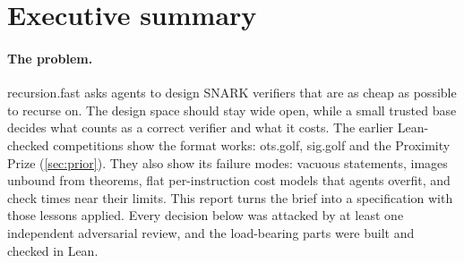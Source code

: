 \section{Executive summary}\label{sec:summary}

\paragraph{The problem.} recursion.fast asks agents to design SNARK verifiers that are as cheap as
possible to recurse on. The design space should stay wide open, while a small trusted base decides
what counts as a correct verifier and what it costs. The earlier Lean-checked competitions show the
format works: ots.golf, sig.golf and the Proximity Prize (\cref{sec:prior}). They also show its
failure modes: vacuous statements, images unbound from theorems, flat per-instruction cost models
that agents overfit, and check times near their limits. This report turns the brief into a
specification with those lessons applied. Every decision below was attacked by at least one
independent adversarial review, and the load-bearing parts were built and checked in Lean.

